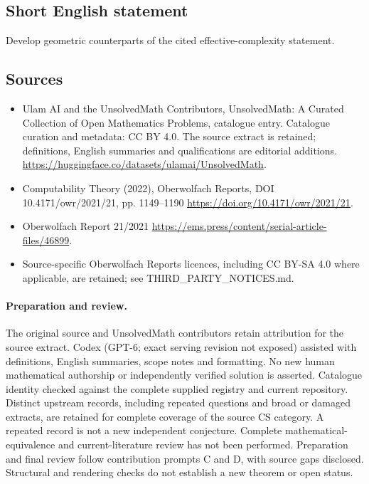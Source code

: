 \documentclass[11pt]{article}
\begin{document}
\subsection{Short English statement}
Develop geometric counterparts of the cited effective-complexity statement.
\subsection{Sources}
\begin{itemize}
\item[\hypertarget{source:statement:1}{S1}] Ulam AI and the UnsolvedMath Contributors, UnsolvedMath: A Curated Collection of Open Mathematics Problems, catalogue entry. Catalogue curation and metadata: CC BY 4.0. The source extract is retained; definitions, English summaries and qualifications are editorial additions.
\url{https://huggingface.co/datasets/ulamai/UnsolvedMath}.
\item[\hypertarget{source:statement:2}{S2}] Computability Theory (2022), Oberwolfach Reports, DOI 10.4171/owr/2021/21, pp. 1149--1190
\url{https://doi.org/10.4171/owr/2021/21}.
\item[\hypertarget{source:statement:3}{S3}] Oberwolfach Report 21/2021
\url{https://ems.press/content/serial-article-files/46899}.
\item Source-specific Oberwolfach Reports licences, including CC BY-SA 4.0 where applicable, are retained; see THIRD\_PARTY\_NOTICES.md.
\end{itemize}
\paragraph{Preparation and review.}
The original source and UnsolvedMath contributors retain attribution for the source extract. Codex (GPT-6; exact serving revision not exposed) assisted with definitions, English summaries, scope notes and formatting. No new human mathematical authorship or independently verified solution is asserted. Catalogue identity checked against the complete supplied registry and current repository. Distinct upstream records, including repeated questions and broad or damaged extracts, are retained for complete coverage of the source CS category. A repeated record is not a new independent conjecture. Complete mathematical-equivalence and current-literature review has not been performed. Preparation and final review follow contribution prompts C and D, with source gaps disclosed. Structural and rendering checks do not establish a new theorem or open status.
\label{end:statement}
\end{document}
